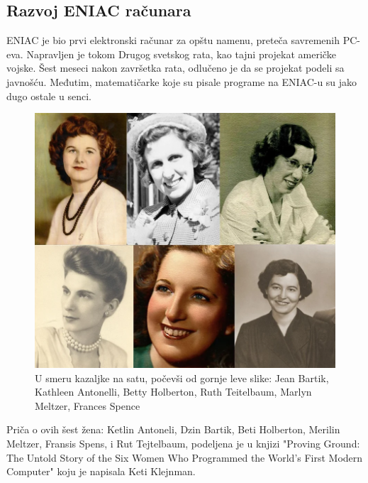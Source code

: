 \documentclass[12pt]{article}
\begin{document}
\subsection{Razvoj ENIAC računara}
\begin{text}
ENIAC je bio prvi elektronski računar za opštu namenu, preteča savremenih PC-eva. Napravljen je tokom Drugog svetskog rata, kao tajni projekat američke vojske. Šest meseci nakon završetka rata, odlučeno je da se projekat podeli sa javnošću. Međutim, matematičarke koje su pisale programe na ENIAC-u su jako dugo ostale u senci. 

\begin{figure}[htp]
    \centering
    \includegraphics[width=0.9\linewidth]{eniacwomen.png}
    \caption{U smeru kazaljke na satu, počevši od gornje leve slike: Jean Bartik, Kathleen Antonelli, Betty Holberton, Ruth Teitelbaum, Marlyn Meltzer, Frances Spence}
\end{figure}

Priča o ovih šest žena: Ketlin Antoneli, Dzin Bartik, Beti Holberton, Merilin Meltzer, Fransis Spens, i Rut Tejtelbaum, podeljena je u knjizi "Proving Ground: The Untold Story of the Six Women Who Programmed the World’s First Modern Computer" koju je napisala Keti Klejnman. 
\end{text}
\end{document}
